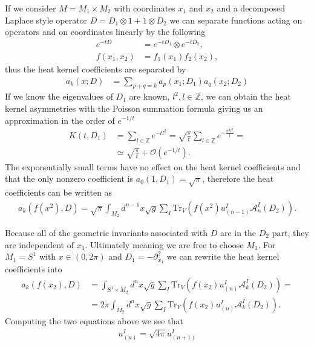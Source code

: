 If we consider $M = M_1 \times M_2$ with coordinates $x_1$ and $x_2$ and a
decomposed Laplace style operator $D = D_1 \otimes 1 + 1 \otimes D_2$ we can
separate functions acting on operators and on coordinates linearly by the
following
\begin{align}
    e^{-tD} &= e^{-tD_1} \otimes e^{-tD_2},\\
    f(x_1, x_2) &= f_1(x_1)f_2(x_2),
\end{align}
thus the heat kernel coefficients are separated by
\begin{align}
    a_k(x;D) &= \sum_{p+q=k} a_p(x_1; D_1)a_q(x_2;D_2)
\end{align}
If we know the eigenvalues of $D_1$ are known,  $l^2, l\in \mathbb{Z}$, we
can obtain the heat kernel asymmetries with the Poisson summation formula
giving us an approximation in the order of $e^{-1/t}$
\begin{align}
    K(t, D_1) &= \sum_{l\in\mathbb{Z}} e^{-tl^2} = \sqrt{\frac{\pi}{t}}
    \sum_{l\in\mathbb{Z}} e^{-\frac{\pi^2l^2}{t}} = \nonumber \\
    &\simeq \sqrt{\frac{\pi}{t}} + \mathcal{O}(e^{-1/t}).
\end{align}
The exponentially small terms have no effect on the heat kernel
coefficients and that the only nonzero coefficient is $a_0(1, D_1) =
\sqrt{\pi}$, therefore the heat coefficients can be written as
\begin{align}
    a_k(f(x^2), D) = \sqrt{\pi}\int_{M_2}
    d^{n-1}x\sqrt{g}\sum_I\text{Tr}_V\left(f(x^2)u^I_{(n-1)}
    \mathcal{A}^I_n(D_2)\right).
\end{align}

Because all of the geometric invariants  associated with $D$ are in the $D_2$
part, they are independent of $x_1$. Ultimately meaning we are free to choose
$M_1$. For $M_1 = S^1$ with $x\in (0, 2\pi)$ and $D_1=-\partial_{x_1}^2$
we can rewrite the heat kernel coefficients into
\begin{align}
    a_k(f(x_2), D) &= \int_{S^1\times M_2}d^nx \sqrt{g} \sum_I
    \text{Tr}_V(f(x_2) u_{(n)}^I \mathcal{A}^I_k(D_2))= \nonumber\\
    &= 2\pi \int_{M_2} d^nx\sqrt{g} \sum_I\text{Tr}_V(f(x_2) u_{(n)}^I
    \mathcal{A}^I_k(D_2)).
\end{align}
Computing the two equations above we see that
\begin{align}
    u_{(n)}^I = \sqrt{4\pi} u^I_{(n+1)}
\end{align}

